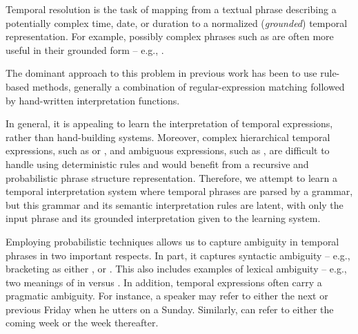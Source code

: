 
Temporal resolution is the task of mapping from a textual phrase describing
	a potentially complex time, date, or duration to a normalized
	(\textit{grounded}) temporal representation.
For example, possibly complex phrases such as  are
	often more useful in their grounded form -- e.g., .


The dominant approach to this problem in previous work has been to use
	rule-based methods, generally a combination of regular-expression matching
	followed by hand-written interpretation functions.

In general, it is appealing to learn the interpretation of temporal expressions,
	rather than hand-building systems.
Moreover, complex hierarchical temporal expressions, such as 
	 or ,
	and ambiguous expressions, such as , are difficult to
	handle using deterministic rules and would benefit from a
	recursive and probabilistic phrase structure representation.
Therefore, we attempt to learn
	a temporal interpretation system where temporal phrases are parsed by
	a grammar, but this grammar and its semantic interpretation rules are
	latent, with only the input phrase and its grounded interpretation given
	to the learning system.

Employing probabilistic techniques allows us to capture ambiguity in temporal 
	phrases in two important respects.
In part, it captures syntactic ambiguity -- e.g.,  bracketing as either , or
	.
This also includes examples of lexical ambiguity -- e.g., two
	meanings of  in  versus .
In addition, temporal expressions often carry a pragmatic ambiguity.
For instance, a speaker may refer to either the next or previous Friday
	when he utters  on a Sunday.
Similarly,  can refer to either the coming week or the week
	thereafter.


